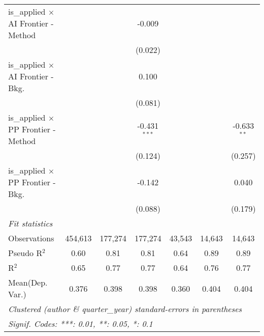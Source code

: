 \begin{tabular}{lcccccc}
   is\_applied $\times$ AI Frontier - Method   &                &                & -0.009         &                &              &   \\   
                                               &                &                & (0.022)        &                &              &   \\   
   is\_applied $\times$ AI Frontier - Bkg.     &                &                & 0.100          &                &              &   \\   
                                               &                &                & (0.081)        &                &              &   \\   
   is\_applied $\times$ PP Frontier - Method   &                &                & -0.431$^{***}$ &                &              & -0.633$^{**}$\\   
                                               &                &                & (0.124)        &                &              & (0.257)\\   
   is\_applied $\times$ PP Frontier - Bkg.     &                &                & -0.142         &                &              & 0.040\\   
                                               &                &                & (0.088)        &                &              & (0.179)\\   
   \midrule
   \emph{Fit statistics}\\
   Observations                                & 454,613        & 177,274        & 177,274        & 43,543         & 14,643       & 14,643\\  
   Pseudo R$^2$                                & 0.60           & 0.81           & 0.81           & 0.64           & 0.89         & 0.89\\  
   R$^2$                                       & 0.65           & 0.77           & 0.77           & 0.64           & 0.76         & 0.77\\  
Mean(Dep. Var.) & 0.376 & 0.398 & 0.398 & 0.360 & 0.404 & 0.404 \\
   \midrule \midrule
   \multicolumn{7}{l}{\emph{Clustered (author \& quarter\_year) standard-errors in parentheses}}\\
   \multicolumn{7}{l}{\emph{Signif. Codes: ***: 0.01, **: 0.05, *: 0.1}}\\
\end{tabular}
\par\endgroup
